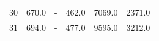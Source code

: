 \begin{table}
\begin{tabular}{|l|c|c|c|c|c|}
30 & 670.0 & - & 462.0 & 7069.0 & 2371.0 \\
31 & 694.0 & - & 477.0 & 9595.0 & 3212.0 \\
        \hline
    \end{tabular}
    \label{table:runtime}
\end{table}

